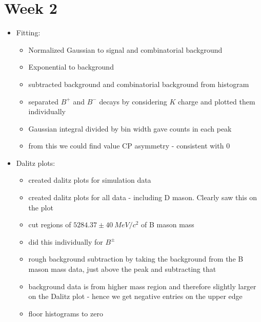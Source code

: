 \documentclass[10pt]{article}
\begin{document}
\section{Week 2}
\begin{itemize}
\item Fitting:
\begin{itemize}
\item Normalized Gaussian to signal and combinatorial background
\item Exponential to background
\item subtracted background and combinatorial background from histogram
\item separated $B^+$ and $B^-$ decays by considering $K$ charge and plotted them individually
\item Gaussian integral divided by bin width gave counts in each peak
\item from this we could find value CP asymmetry - consistent with 0
\end{itemize}
\item{Dalitz plots:}
\begin{itemize}
\item created dalitz plots for simulation data
\item created dalitz plots for all data - including D mason. Clearly saw this on the plot
\item cut regions of $5284.37 \pm 40~MeV/c^2$ of B mason mass
\item did this individually for $B^\pm$
\item rough background subtraction by taking the background from the B mason mass data, just above the peak and subtracting that
\item background data is from higher mass region and therefore slightly larger on the Dalitz plot - hence we get negative entries on the upper edge
\item floor histograms to zero

\end{itemize}
\end{itemize}
\end{document}
